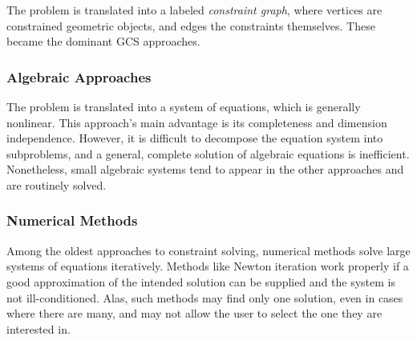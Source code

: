 The problem is translated into a labeled \textit{constraint graph}, where
vertices are constrained geometric objects, and edges the constraints
themselves.  These became the dominant \ac{GCS} approaches.

\subsubsection{Algebraic Approaches}%
\label{sec:intro.constraints.algebraic}

The problem is translated into a system of equations, which is generally
nonlinear.  This approach's main advantage is its completeness and dimension
independence.  However, it is difficult to decompose the equation system into
subproblems, and a general, complete solution of algebraic equations is
inefficient.  Nonetheless, small algebraic systems tend to appear in the other
approaches and are routinely solved.

\subsubsection{Numerical Methods}%
\label{sec:intro.constraints.numerical}

Among the oldest approaches to constraint solving, numerical methods solve large
systems of equations iteratively.  Methods like Newton iteration work properly
if a good approximation of the intended solution can be supplied and the system
is not ill-conditioned.  Alas, such methods may find only one solution, even in
cases where there are many, and may not allow the user to select the one they
are interested in.

